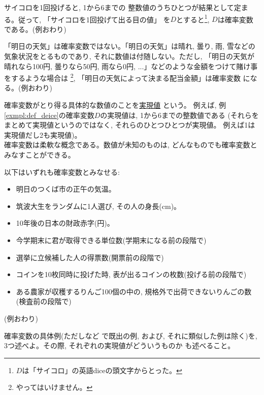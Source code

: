 
\begin{exmpl}\label{exmpl:def_deice} サイコロを1回投げると, 1から6までの
整数値のうちひとつが結果として定まる。従って, 「サイコロを1回投げて出る目の値」
を$D$とすると\footnote{$D$は「サイコロ」の英語diceの頭文字からとった。}, $D$は確率変数である。(例おわり)\end{exmpl}

\begin{exmpl} 「明日の天気」は確率変数ではない。「明日の天気」は晴れ, 曇り, 雨, 雪などの
気象状況をとるものであり, それに数値は付随しない。ただし, 「明日の天気が晴れなら100円, 
曇りなら50円, 雨なら0円, ...」などのような金額をつけて賭け事をするような場合は
\footnote{やってはいけません。}, 「明日の天気によって決まる配当金額」は確率変数
になる。(例おわり)\end{exmpl}

確率変数がとり得る具体的な数値のことを\underline{実現値} という。
例えば, 例\ref{exmpl:def_deice}の確率変数$D$の実現値は, 1から6までの整数値である
(それらをまとめて実現値というのではなく, それらのひとつひとつが実現値。
例えば1は実現値だし2も実現値)。\\

確率変数は柔軟な概念である。数値が未知のものは, どんなものでも確率変数とみなすことができる。

\begin{exmpl}\label{exmpl:stochastic_variable03} 以下はいずれも確率変数とみなせる:
\begin{itemize}
\item 明日のつくば市の正午の気温。
\item 筑波大生をランダムに1人選び, その人の身長(cm)。
\item 10年後の日本の財政赤字(円)。
\item 今学期末に君が取得できる単位数(学期末になる前の段階で)
\item 選挙に立候補した人の得票数(開票前の段階で)
\item コインを10枚同時に投げた時, 表が出るコインの枚数(投げる前の段階で)
\item ある農家が収穫するりんご100個の中の, 規格外で出荷できないりんごの数(検査前の段階で)
\end{itemize}
(例おわり)\end{exmpl}

\begin{q}\label{q:stochastic_variable03} 確率変数の具体例(ただしなど
で既出の例, および, それに類似した例は除く)を, 3つ述べよ。その際, それぞれの実現値がどういうものか
も述べること。
\end{q}

